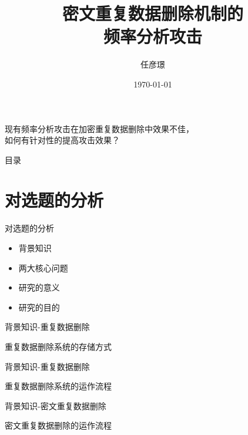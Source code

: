 \documentclass[aspectratio=43]{beamer}
\title{密文重复数据删除机制的\\频率分析攻击}
\date{\today}
\author[Tinoryj]{任彦璟}
\begin{document}
\begin{frame}
\titlepage
\end{frame}

\begin{frame}
\begin{card}
现有频率分析攻击在加密重复数据删除中效果不佳，\\[2mm]如何有针对性的提高攻击效果？
\end{card}
\end{frame}


\begin{frame}{目录}
\begin{card}
\tableofcontents
\end{card}
\end{frame}

\section{对选题的分析}

\begin{frame}{对选题的分析}
\begin{card}
\begin{itemize}
    \item 背景知识
    \item 两大核心问题
    \item 研究的意义
    \item 研究的目的
\end{itemize}
\end{card}
\end{frame}

\begin{frame}{背景知识-重复数据删除}
\centering
{}
\begin{card}
重复数据删除系统的存储方式
\end{card}   
\end{frame}

\begin{frame}{背景知识-重复数据删除}
\centering
{}
\begin{card}
重复数据删除系统的运作流程
\end{card}   
\end{frame}

\begin{frame}{背景知识-密文重复数据删除}
\centering
{}
\begin{card}
密文重复数据删除的运作流程
\end{card}   
\end{frame}
\end{document}
